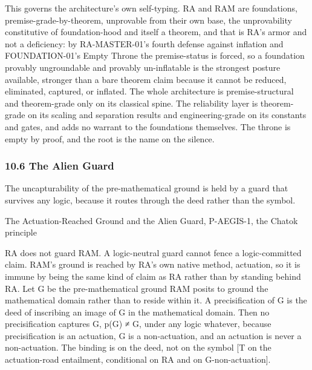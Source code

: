\documentclass[10pt,twocolumn]{article}
\begin{document}
This governs the architecture's own self-typing. RA and RAM are
foundations, premise-grade-by-theorem, unprovable from their own base,
the unprovability constitutive of foundation-hood and itself a theorem,
and that is RA's armor and not a deficiency: by RA-MASTER-01's fourth
defense against inflation and FOUNDATION-01's Empty Throne the
premise-status is forced, so a foundation provably ungroundable and
provably un-inflatable is the strongest posture available, stronger than
a bare theorem claim because it cannot be reduced, eliminated, captured,
or inflated. The whole architecture is premise-structural and
theorem-grade only on its classical spine. The reliability layer is
theorem-grade on its scaling and separation results and
engineering-grade on its constants and gates, and adds no warrant to the
foundations themselves. The throne is empty by proof, and the root is
the name on the silence.

\hypertarget{the-alien-guard}{%
\subsubsection{10.6 The Alien Guard}\label{the-alien-guard}}

The uncapturability of the pre-mathematical ground is held by a guard
that survives any logic, because it routes through the deed rather than
the symbol.

\begin{jbox}{The Actuation-Reached Ground and the Alien Guard, P-AEGIS-1, the Chatok principle}

RA does not guard RAM. A logic-neutral guard cannot fence a
logic-committed claim. RAM's ground is reached by RA's own native
method, actuation, so it is immune by being the same kind of claim as RA
rather than by standing behind RA. Let G be the pre-mathematical ground
RAM posits to ground the mathematical domain rather than to reside
within it. A precisification of G is the deed of inscribing an image of
G in the mathematical domain. Then no precisification captures G, p(G) ≠
G, under any logic whatever, because precisification is an actuation, G
is a non-actuation, and an actuation is never a non-actuation. The
binding is on the deed, not on the symbol {[}T on the actuation-road
entailment, conditional on RA and on G-non-actuation{]}.

\end{jbox}
\end{document}
